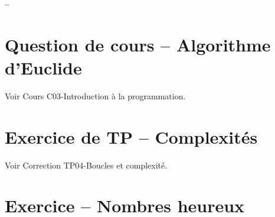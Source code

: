 

%



\begin{center}
{\Large\bf {\type} \no {\numero} -- \descrip}
\end{center}


\section{Question de cours -- Algorithme d'Euclide}

Voir Cours C03-Introduction à la programmation.

\section{Exercice de TP -- Complexités}

Voir Correction TP04-Boucles et complexité.

\section{Exercice -- Nombres heureux}

